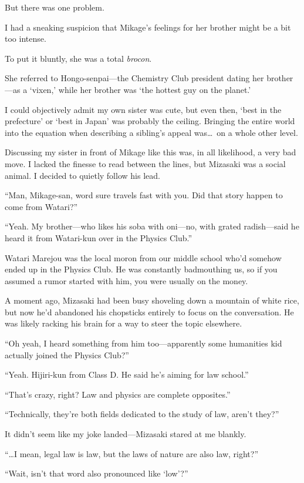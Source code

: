 \documentclass[
    a4paper,
    12pt,
    twoside,
    openany,
    UTF8,
    fontset=windows
]{ctexbook}
\begin{document}
But there was one problem.

I had a sneaking suspicion that Mikage's feelings for her brother might be a bit too intense.

To put it bluntly, she was a total \textit{brocon}.

She referred to Hongo-senpai---the Chemistry Club president dating her brother---as a `vixen,' while her brother was `the hottest guy on the planet.'

I could objectively admit my own sister was cute, but even then, `best in the prefecture' or `best in Japan' was probably the ceiling. Bringing the entire world into the equation when describing a sibling's appeal was\dots\ on a whole other level.

Discussing my sister in front of Mikage like this was, in all likelihood, a very bad move. I lacked the finesse to read between the lines, but Mizasaki was a social animal. I decided to quietly follow his lead.

``Man, Mikage-san, word sure travels fast with you. Did that story happen to come from Watari?''

``Yeah. My brother---who likes his soba with oni---no, with grated radish---said he heard it from Watari-kun over in the Physics Club.''

Watari Marejou was the local moron from our middle school who'd somehow ended up in the Physics Club. He was constantly badmouthing us, so if you assumed a rumor started with him, you were usually on the money.

A moment ago, Mizasaki had been busy shoveling down a mountain of white rice, but now he'd abandoned his chopsticks entirely to focus on the conversation. He was likely racking his brain for a way to steer the topic elsewhere.

``Oh yeah, I heard something from him too---apparently some humanities kid actually joined the Physics Club?''

``Yeah. Hijiri-kun from Class D. He said he's aiming for law school.''

``That's crazy, right? Law and physics are complete opposites.''

``Technically, they're both fields dedicated to the study of law, aren't they?''

It didn't seem like my joke landed---Mizasaki stared at me blankly.

``\dots I mean, legal law is law, but the laws of nature are also law, right?''

``Wait, isn't that word also pronounced like `low'?''
\end{document}
